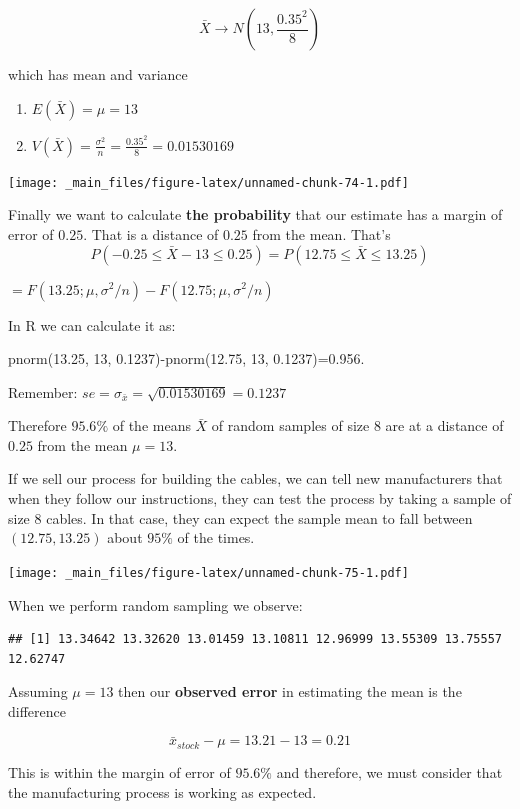 \documentclass[
]{book}
\providecommand{\tightlist}{%
  \setlength{\itemsep}{0pt}\setlength{\parskip}{0pt}}
\begin{document}
\[\bar{X} \rightarrow N(13, \frac{0.35^2}{8})\]

which has mean and variance

\begin{enumerate}
\def\labelenumi{\arabic{enumi})}
\tightlist
\item
  \(E(\bar{X})=\mu=13\)
\item
  \(V(\bar{X})=\frac{\sigma^2}{n}=\frac{0.35^2}{8}=0.01530169\)
\end{enumerate}

\texttt{[image: \_main\_files/figure-latex/unnamed-chunk-74-1.pdf]}

Finally we want to calculate \textbf{the probability} that our estimate has a margin of error of \(0.25\). That is a distance of \(0.25\) from the mean. That's \[P(-0.25 \leq \bar{X} - 13\leq 0.25)=P(12.75 \leq \bar{X} \leq 13.25)\]

\(=F(13.25; \mu, \sigma^2/n)-F(12.75; \mu, \sigma^2/n)\)

In R we can calculate it as:

pnorm(13.25, 13, 0.1237)-pnorm(12.75, 13, 0.1237)=0.956.

Remember: \(se=\sigma_{\bar{x}}=\sqrt{0.01530169}=0.1237\)

Therefore \(95.6\%\) of the means \(\bar{X}\) of random samples of size \(8\) are at a distance of \(0.25\) from the mean \(\mu=13\).

If we sell our process for building the cables, we can tell new manufacturers that when they follow our instructions, they can test the process by taking a sample of size \(8\) cables. In that case, they can expect the sample mean to fall between \((12.75, 13.25)\) about \(95\%\) of the times.

\texttt{[image: \_main\_files/figure-latex/unnamed-chunk-75-1.pdf]}

When we perform random sampling we observe:

\begin{verbatim}
## [1] 13.34642 13.32620 13.01459 13.10811 12.96999 13.55309 13.75557 12.62747
\end{verbatim}

Assuming \(\mu=13\) then our \textbf{observed error} in estimating the mean is the difference

\[\bar{x}_{stock}-\mu=13.21-13=0.21\]

This is within the margin of error of \(95.6\%\) and therefore, we must consider that the manufacturing process is working as expected.
\end{document}
